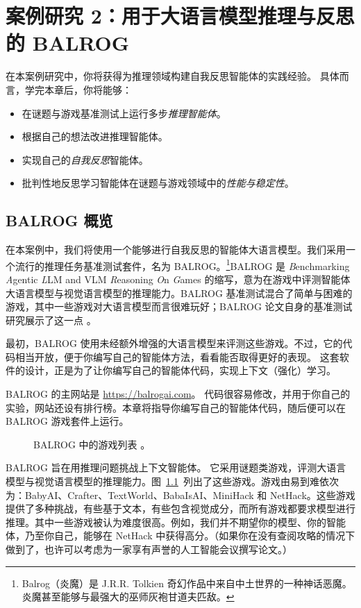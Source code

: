 \chapter[案例研究 2：推理与反思]{案例研究 2：用于大语言模型推理与反思的 BALROG}\label{chap:balrog}

\begin{learningbox}
在本案例研究中，你将获得为推理领域构建自我反思智能体的实践经验。
具体而言，学完本章后，你将能够：
\begin{itemize}[leftmargin=*, nosep]
    \item 在谜题与游戏基准测试上运行多步{\em 推理智能体}。
    \item 根据自己的想法改进推理智能体。
    \item 实现自己的{\em 自我反思}智能体。
    \item 批判性地反思学习智能体在谜题与游戏领域中的{\em 性能与稳定性}。
\end{itemize}
\end{learningbox}

\section{BALROG 概览}
在本案例中，我们将使用一个能够进行自我反思的智能体大语言模型。我们采用一个流行的推理任务基准测试套件，名为 BALROG。\footnote{Balrog（炎魔）是 J.R.R. Tolkien 奇幻作品中来自中土世界的一种神话恶魔。炎魔甚至能够与最强大的巫师灰袍甘道夫匹敌。}BALROG 是 {\em B}enchmarking {\em A}gentic {\em L}LM and VLM {\em R}easoning {\em O}n {\em G}ames 的缩写，意为在游戏中评测智能体大语言模型与视觉语言模型的推理能力。BALROG 基准测试混合了简单与困难的游戏，其中一些游戏对大语言模型而言很难玩好；BALROG 论文自身的基准测试研究展示了这一点 \citep{paglieri2024balrog}。

最初，BALROG 使用未经额外增强的大语言模型来评测这些游戏。不过，它的代码相当开放，便于你编写自己的智能体方法，看看能否取得更好的表现。
这套软件的设计，正是为了让你编写自己的智能体代码，实现上下文（强化）学习。

BALROG 的主网站是 \url{https://balrogai.com}。
代码很容易修改，并用于你自己的实验，网站还设有排行榜。本章将指导你编写自己的智能体代码，随后便可以在 BALROG 游戏套件上运行。

\begin{figure}[t]
    \centering
    
    \caption{BALROG 中的游戏列表 \citep{paglieri2024balrog}。}
    \label{fig:balrog}
\end{figure}

BALROG 旨在用推理问题挑战上下文智能体。
它采用谜题类游戏，评测大语言模型与视觉语言模型的推理能力。图~\ref{fig:balrog}~列出了这些游戏。游戏由易到难依次为：BabyAI、Crafter、TextWorld、BabaIsAI、MiniHack 和 NetHack。这些游戏提供了多种挑战，有些基于文本，有些包含视觉成分，而所有游戏都要求模型进行推理。其中一些游戏被认为难度很高。例如，我们并不期望你的模型、你的智能体，乃至你自己，能够在 NetHack 中获得高分。（如果你在没有查阅攻略的情况下做到了，也许可以考虑为一家享有声誉的人工智能会议撰写论文。）

